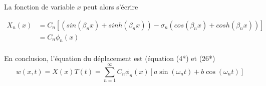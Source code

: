 \documentclass[a4paper,10pt]{article}
\begin{document}
La fonction de variable \begin{math} x  \end{math} peut alors s'écrire 

\begin{equation} 
	\begin{aligned}
			 X_n(x) 	&=	C_ n[ (sin(\beta_n x) + sinh(\beta_n x)) - \sigma_n (cos(\beta_n x) + cosh(\beta_n x))] \\
			  		&=	C_n \phi_n(x) \\
	\end{aligned}
\end{equation}


En conclusion, l'équation du déplacement est (équation (4*) et (26*)
\begin{equation} \boxed{ w(x,t)= X(x) T(t) = \sum_{n=1}^{\infty} C_n \phi_n(x) [a\sin(\omega_n t) + b\cos(\omega_n t)] } \end{equation}







 
\end{document}
